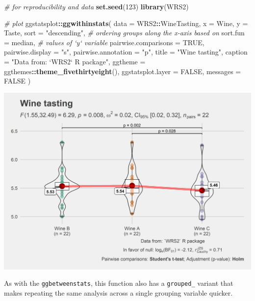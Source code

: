\documentclass[]{article}
\newenvironment{Shaded}{\begin{snugshade}}{\end{snugshade}}
\newcommand{\CommentTok}[1]{\textcolor[rgb]{0.56,0.35,0.01}{\textit{#1}}}
\newcommand{\DataTypeTok}[1]{\textcolor[rgb]{0.13,0.29,0.53}{#1}}
\newcommand{\DecValTok}[1]{\textcolor[rgb]{0.00,0.00,0.81}{#1}}
\newcommand{\KeywordTok}[1]{\textcolor[rgb]{0.13,0.29,0.53}{\textbf{#1}}}
\newcommand{\NormalTok}[1]{#1}
\newcommand{\OperatorTok}[1]{\textcolor[rgb]{0.81,0.36,0.00}{\textbf{#1}}}
\newcommand{\OtherTok}[1]{\textcolor[rgb]{0.56,0.35,0.01}{#1}}
\newcommand{\StringTok}[1]{\textcolor[rgb]{0.31,0.60,0.02}{#1}}
\begin{document}
\begin{Shaded}
\begin{Highlighting}[]
\CommentTok{# for reproducibility and data}
\KeywordTok{set.seed}\NormalTok{(}\DecValTok{123}\NormalTok{)}
\KeywordTok{library}\NormalTok{(WRS2)}

\CommentTok{# plot}
\NormalTok{ggstatsplot}\OperatorTok{::}\KeywordTok{ggwithinstats}\NormalTok{(}
  \DataTypeTok{data =}\NormalTok{ WRS2}\OperatorTok{::}\NormalTok{WineTasting,}
  \DataTypeTok{x =}\NormalTok{ Wine,}
  \DataTypeTok{y =}\NormalTok{ Taste,}
  \DataTypeTok{sort =} \StringTok{"descending"}\NormalTok{, }\CommentTok{# ordering groups along the x-axis based on}
  \DataTypeTok{sort.fun =}\NormalTok{ median, }\CommentTok{# values of `y` variable}
  \DataTypeTok{pairwise.comparisons =} \OtherTok{TRUE}\NormalTok{,}
  \DataTypeTok{pairwise.display =} \StringTok{"s"}\NormalTok{,}
  \DataTypeTok{pairwise.annotation =} \StringTok{"p"}\NormalTok{,}
  \DataTypeTok{title =} \StringTok{"Wine tasting"}\NormalTok{,}
  \DataTypeTok{caption =} \StringTok{"Data from: `WRS2` R package"}\NormalTok{,}
  \DataTypeTok{ggtheme =}\NormalTok{ ggthemes}\OperatorTok{::}\KeywordTok{theme_fivethirtyeight}\NormalTok{(),}
  \DataTypeTok{ggstatsplot.layer =} \OtherTok{FALSE}\NormalTok{,}
  \DataTypeTok{messages =} \OtherTok{FALSE}
\NormalTok{)}
\end{Highlighting}
\end{Shaded}

\includegraphics[width=1\linewidth]{./figures/paper-ggwithinstats1-1}

As with the \texttt{ggbetweenstats}, this function also has a \texttt{grouped\_} variant that
makes repeating the same analysis across a single grouping variable quicker.
\end{document}
